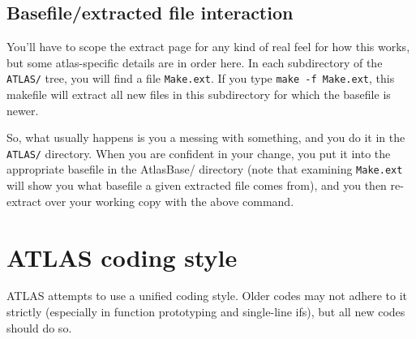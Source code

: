 \documentclass[11pt]{article}
\begin{document}
\subsection{Basefile/extracted file interaction}
You'll have to scope the extract page for any kind of real feel for how
this works, but some atlas-specific details are in order here.
In each subdirectory of the {\tt ATLAS/} tree, you will find
a file {\tt Make.ext}.  If you type {\tt make -f Make.ext}, this
makefile will extract all new files in this subdirectory for which the
basefile is newer.

So, what usually happens is you a messing with something, and you do it in
the {\tt ATLAS/} directory.  When you are confident in your change,
you put it into the appropriate basefile in the AtlasBase/ directory
(note that examining {\tt Make.ext} will show you what basefile a given
extracted file comes from), and you then re-extract over your working
copy with the above command.

\section{ATLAS coding style}

ATLAS attempts to use a unified coding style.  Older codes may not adhere
to it strictly (especially in function prototyping and single-line ifs), 
but all new codes should do so.
\end{document}
